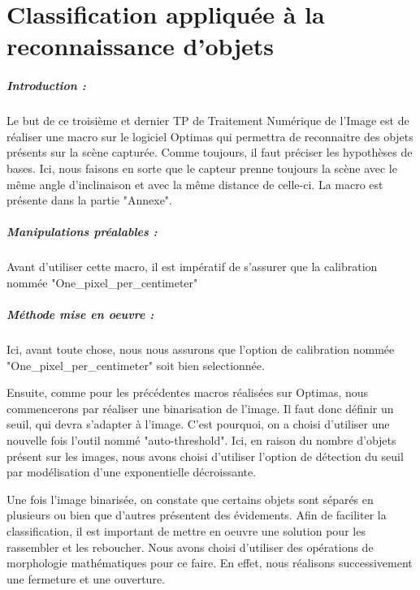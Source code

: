 \documentclass{scrreprt}
\begin{document}
\tableofcontents

\chapter{Classification appliquée à la reconnaissance d'objets}

\paragraph{Introduction :}
Le but de ce troisième et dernier TP de Traitement Numérique de l'Image est
de réaliser une macro sur le logiciel Optimas qui permettra de reconnaitre 
des objets présents sur la scène capturée. 
Comme toujours, il faut préciser les hypothèses de 
bases. Ici, nous faisons en sorte que le capteur prenne toujours la 
scène avec le même angle d'inclinaison et avec la même distance de celle-ci.
La macro est présente dans la partie "Annexe".

\paragraph{Manipulations préalables :}
Avant d'utiliser cette macro, il est impératif de s'assurer que la
calibration nommée "One_pixel_per_centimeter" 

\paragraph{Méthode mise en oeuvre :}
Ici, avant toute chose, nous nous assurons que l'option de calibration nommée
"One_pixel_per_centimeter" soit bien selectionnée. 

Ensuite, comme pour les précédentes macros réalisées sur Optimas, nous commencerons
par réaliser une binarisation de l'image. Il faut donc définir un seuil, 
qui devra s'adapter à l'image. C'est pourquoi, on a choisi d'utiliser une
nouvelle fois l'outil nommé "auto-threshold". Ici, en raison du nombre d'objets
présent sur les images, nous avons choisi d'utiliser l'option de détection du seuil
par modélisation d'une exponentielle décroissante. 

Une fois l'image binarisée, on constate que certains objets sont séparés en plusieurs
ou bien que d'autres présentent des évidements. Afin de faciliter la classification, 
il est important de mettre en oeuvre une solution pour les rassembler et les reboucher.
Nous avons choisi d'utiliser des opérations de morphologie mathématiques pour ce faire.
En effet, nous réalisons successivement une fermeture et une ouverture. 
\end{document}
